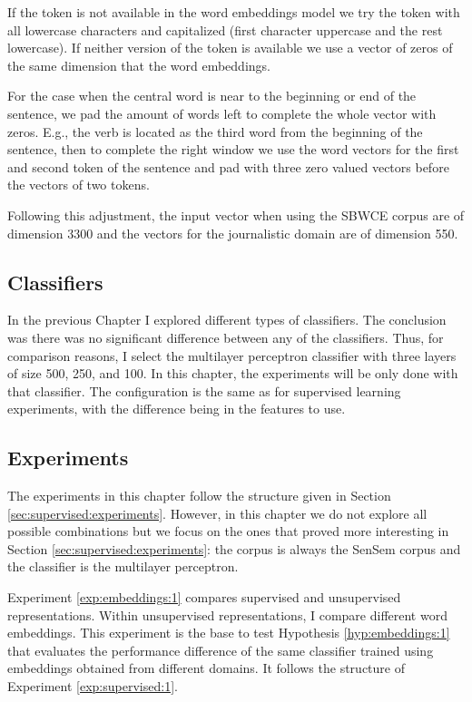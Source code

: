 If the token is not available in the word embeddings model we try the token
with all lowercase characters and capitalized (first character uppercase and
the rest lowercase). If neither version of the token is available we use a
vector of zeros of the same dimension that the word embeddings.

For the case when the central word is near to the beginning or end of the
sentence, we pad the amount of words left to complete the whole vector with
zeros. E.g., the verb is located as the third word from the beginning of the
sentence, then to complete the right window we use the word vectors for the
first and second token of the sentence and pad with three zero valued vectors
before the vectors of two tokens.

Following this adjustment, the input vector when using the SBWCE corpus are
of dimension 3300 and the vectors for the journalistic domain are of
dimension 550.

\subsection{Classifiers}\label{sec:embeddings:classifiers}

In the previous Chapter I explored different types of classifiers. The
conclusion was there was no significant difference between any of the
classifiers. Thus, for comparison reasons, I select the multilayer perceptron
classifier with three layers of size 500, 250, and 100. In this chapter, the
experiments will be only done with that classifier. The configuration is the
same as for supervised learning experiments, with the difference being in the
features to use.

\subsection{Experiments}\label{sec:embeddings:experiments}

The experiments in this chapter follow the structure given in Section
\ref{sec:supervised:experiments}. However, in this chapter we do not explore
all possible combinations but we focus on the ones that proved more interesting
in Section \ref{sec:supervised:experiments}: the corpus is always the SenSem 
corpus and the classifier is the multilayer perceptron.

Experiment \ref{exp:embeddings:1} compares supervised and unsupervised
representations. Within unsupervised representations, I compare different word
embeddings. This experiment is the base to test Hypothesis
\ref{hyp:embeddings:1} that evaluates the performance difference of the same
classifier trained using embeddings obtained from different domains. It follows
the structure of Experiment \ref{exp:supervised:1}.

